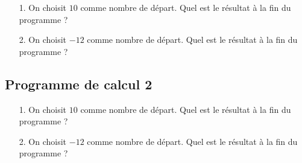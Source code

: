 \begin{enumerate}
  \item[1.] On choisit $10$ comme nombre de départ. \newline Quel est le résultat à la fin du programme ?
  \item[2.] On choisit $-12$ comme nombre de départ. \newline Quel est le résultat à la fin du programme ?
\end{enumerate}

\subsection*{Programme de calcul 2}


\begin{enumerate}
  \item[1.] On choisit $10$ comme nombre de départ. \newline Quel est le résultat à la fin du programme ?
  \item[2.] On choisit $-12$ comme nombre de départ. \newline Quel est le résultat à la fin du programme ?
\end{enumerate}

\newpage

